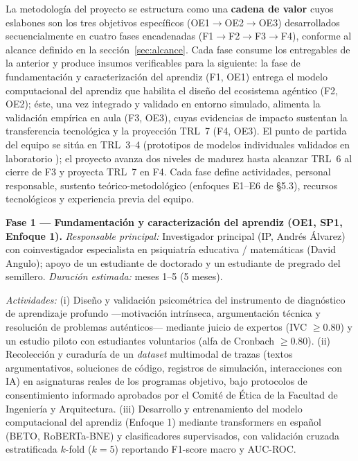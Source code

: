

La metodología del proyecto se estructura como una \textbf{cadena de valor} cuyos
eslabones son los tres objetivos específicos (OE1$\to$OE2$\to$OE3) desarrollados
secuencialmente en cuatro fases encadenadas (F1$\to$F2$\to$F3$\to$F4), conforme al
alcance definido en la sección~\ref{sec:alcance}. Cada fase consume los
entregables de la anterior y produce insumos verificables para la siguiente: la
fase de fundamentación y caracterización del aprendiz (F1, OE1) entrega el modelo
computacional del aprendiz que habilita el diseño del ecosistema agéntico
(F2, OE2); éste, una vez integrado y validado en entorno simulado, alimenta la
validación empírica en aula (F3, OE3), cuyas evidencias de impacto sustentan la
transferencia tecnológica y la proyección TRL~7 (F4, OE3). El punto de partida del
equipo se sitúa en TRL~3--4 (prototipos de modelos individuales validados en
laboratorio \cite{escamilla2022artificial}); el proyecto avanza dos niveles de
madurez hasta alcanzar TRL~6 al cierre de F3 y proyecta TRL~7 en F4. Cada fase
define actividades, personal responsable, sustento teórico-metodológico (enfoques
E1--E6 de \S5.3), recursos tecnológicos y experiencia previa del equipo.

\medskip

\noindent\textbf{Fase 1 — Fundamentación y caracterización del aprendiz
(OE1, SP1, Enfoque 1).}
\emph{Responsable principal:} Investigador principal (IP, Andrés Álvarez) con
coinvestigador especialista en psiquiatría educativa / matemáticas (David
Angulo); apoyo de un estudiante de doctorado y un estudiante de pregrado del
semillero. \emph{Duración estimada:} meses 1--5 (5 meses).

\emph{Actividades:} (i) Diseño y validación psicométrica del instrumento de
diagnóstico de aprendizaje profundo —motivación intrínseca, argumentación
técnica y resolución de problemas auténticos— mediante juicio de expertos
(IVC $\geq 0.80$) y un estudio piloto con estudiantes voluntarios (alfa de Cronbach
$\geq 0.80$). (ii) Recolección y curaduría de un \emph{dataset} multimodal de
trazas (textos argumentativos, soluciones de código, registros de simulación,
interacciones con IA) en asignaturas reales de los programas objetivo, bajo
protocolos de consentimiento informado aprobados por el Comité de Ética de la
Facultad de Ingeniería y Arquitectura. (iii) Desarrollo y entrenamiento del modelo
computacional del aprendiz (Enfoque 1) mediante transformers en español (BETO,
RoBERTa-BNE) y clasificadores supervisados, con validación cruzada estratificada
$k$-fold ($k=5$) reportando F1-score macro y AUC-ROC.

